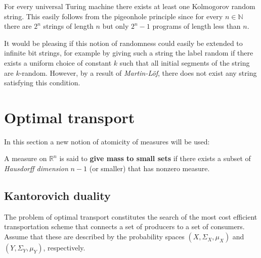     \begin{property}
        For every universal Turing machine there exists at least one Kolmogorov random string. This easily follows from the pigeonhole principle since for every $n\in\mathbb{N}$ there are $2^n$ strings of length $n$ but only $2^n-1$ programs of length less than $n$.
    \end{property}

    It would be pleasing if this notion of randomness could easily be extended to infinite bit strings, for example by giving such a string the label random if there exists a uniform choice of constant $k$ such that all initial segments of the string are $k$-random. However, by a result of \textit{Martin-L\"of}, there does not exist any string satisfying this condition.

\section{Optimal transport}\label{section:optimal_transport}

    In this section a new notion of atomicity of measures will be used:
    \begin{definition}
        A measure on $\mathbb{R}^n$ is said to \textbf{give mass to small sets} if there exists a subset of \textit{Hausdorff dimension} $n-1$ (or smaller) that has nonzero measure.
    \end{definition}

\subsection{Kantorovich duality}

    The problem of optimal transport constitutes the search of the most cost efficient transportation scheme that connects a set of producers to a set of consumers. Assume that these are described by the probability spaces $(X,\Sigma_X,\mu_X)$ and $(Y,\Sigma_Y,\mu_Y)$, respectively.


